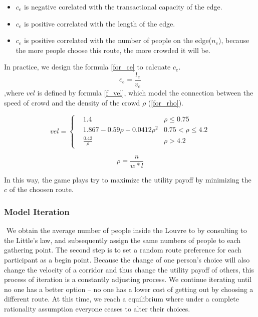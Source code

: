 \documentclass{mcmthesis}
\begin{document}
			\begin{itemize}
				\item $c_e$ is negative corelated with the transactional capacity of the edge.
				\item $c_e$ is positive correlated with the length of the edge.
				\item $c_e$ is positive correlated with the number of people on the edge($n_e$),  because the more people choose this route, the more crowded it will be.
		\end{itemize}
			
In practice, we design the  formula \ref{for_ce} to calcuate $c_e$.
			\begin{equation}
			c_e = \frac{l_e}{v_e}
						\label{for_ce}
			\end{equation}
			 ,where $vel$ is defined by formula \ref{f_vel}, which model the  connection between the speed of crowd  and the density of the crowd $\rho$ (\ref{for_rho}).
			
			\begin{equation}
			vel=\left\{
			\begin{aligned}
			&1.4 &  \rho \le 0.75 \\
			&1.867 - 0.59 \rho + 0.0412 \rho^2 &  0.75 < \rho \le 4.2 \\
			&\frac{0.42}{\rho} &  \rho > 4.2
			\end{aligned}
			\right .
			\label{f_vel}
			\end{equation}
			
			\begin{equation}
			\rho = \frac{n}{w*l}
			\label{for_rho}
			\end{equation}
			
		In this way, the game plays try to maximize the utility payoff by minimizing the $c$ of the choosen route.
		
		\subsubsection{Model Iteration}
		​       We obtain the average number of people inside the  Louvre to by consulting to the Little's law, and subsequently assign the same numbers of people to each gathering point. The second step is to set a random route preference for each participant as a begin point. Because the change of one person’s choice will also change the velocity of a corridor and thus change the utility payoff of others, this process of iteration is a constantly adjusting process. We continue iterating until no one has a better option – no one has a lower cost of getting out by choosing a different route. At this time, we reach a equilibrium where under a complete rationality assumption everyone ceases to alter their choices.
		
\end{document}
